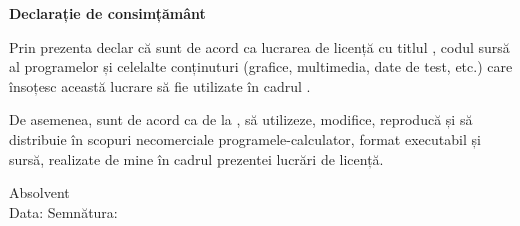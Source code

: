 \vspace*{\fill}
\begin{center}
    \large
    \textbf{Declarație de consimțământ}
\end{center}

Prin prezenta declar că sunt de acord ca lucrarea de licență cu titlul \textbf{\thesistitle}, codul sursă al programelor și celelalte conținuturi (grafice, multimedia, date de test, etc.) care însoțesc această lucrare să fie utilizate în cadrul \facultyg.

De asemenea, sunt de acord ca \faculty \space de la \university, să utilizeze, modifice, reproducă și să distribuie în scopuri necomerciale programele-calculator, format executabil și sursă, realizate de mine în cadrul prezentei lucrări de licență.

\begin{flushright}
    Absolvent \textbf{\authornamefl} \\
    \vspace{0.5cm}
    Data: \dottedline \hspace{6cm} Semnătura: \dottedline
\end{flushright}
\vspace*{\fill}
\pagebreak